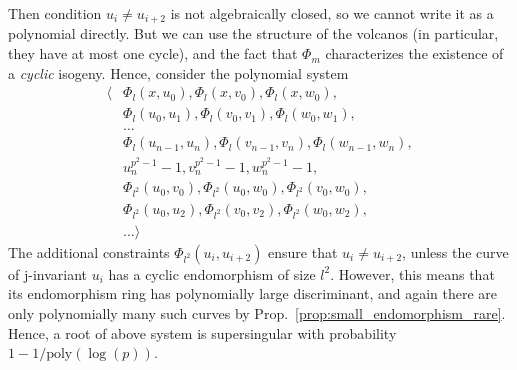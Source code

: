 Then condition $u_i \neq u_{i + 2}$ is not algebraically closed, so we cannot write it as a polynomial directly.
But we can use the structure of the volcanos (in particular, they have at most one cycle), and the fact that $\Phi_m$ characterizes the existence of a \emph{cyclic} isogeny.
Hence, consider the polynomial system
\begin{align*}
    \langle &\Phi_l(x, u_0), \Phi_l(x, v_0), \Phi_l(x, w_0), \\
    &\Phi_l(u_0, u_1), \Phi_l(v_0, v_1), \Phi_l(w_0, w_1), \\
    &... \\
    &\Phi_l(u_{n - 1}, u_n), \Phi_l(v_{n - 1}, v_n), \Phi_l(w_{n - 1}, w_n), \\
    &u_n^{p^2 - 1} - 1, v_n^{p^2 - 1} - 1, w_n^{p^2 - 1} - 1, \\
    &\Phi_{l^2}(u_0, v_0), \Phi_{l^2}(u_0, w_0), \Phi_{l^2}(v_0, w_0), \\
    &\Phi_{l^2}(u_0, u_2), \Phi_{l^2}(v_0, v_2), \Phi_{l^2}(w_0, w_2), \\
    &... \rangle
\end{align*}
The additional constraints $\Phi_{l^2}(u_i, u_{i + 2})$ ensure that $u_i \neq u_{i + 2}$, unless the curve of j-invariant $u_i$ has a cyclic endomorphism of size $l^2$.
However, this means that its endomorphism ring has polynomially large discriminant, and again there are only polynomially many such curves by Prop.~\ref{prop:small_endomorphism_rare}.
Hence, a root of above system is supersingular with probability $1 - 1/\mathrm{poly}(\log(p))$. 

